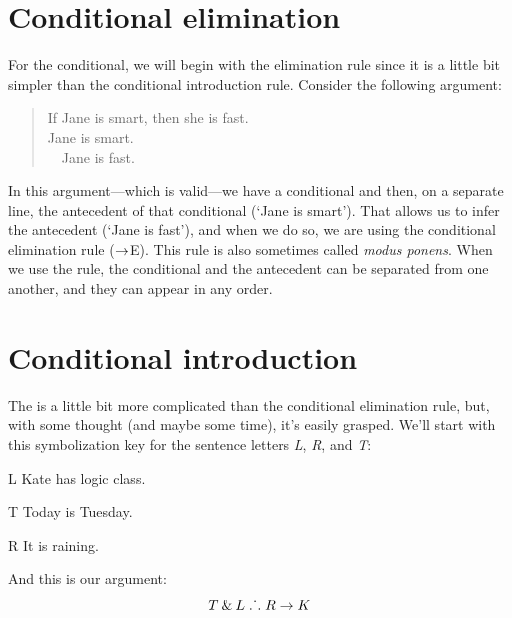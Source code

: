 \section{Conditional elimination}

For the conditional, we will begin with the elimination rule since it is a little bit simpler than the conditional introduction rule. Consider the following argument:
	\begin{quote}
		If Jane is smart, then she is fast.\\
		Jane is smart.\\ 
		\therefore~~Jane is fast.
	\end{quote}
In this argument---which is valid---we have a conditional and then, on a separate line, the antecedent of that conditional (`Jane is smart'). That allows us to infer the antecedent (`Jane is fast'), and when we do so, we are using the conditional elimination rule ($\rightarrow$E).
This rule is also sometimes called \emph{modus ponens}. When we use the rule, the conditional and the antecedent can be separated from one another, and they can appear in any order.


\section{Conditional introduction}

The  is a little bit more complicated than the conditional elimination rule, but, with some thought (and maybe some time), it's easily grasped. We'll start with this symbolization key for the sentence letters \textit{L}, \textit{R}, and \textit{T}:
	\begin{ekey}
		\item[L] Kate has logic class.
		\item[T] Today is Tuesday.
		\item[R] It is raining.
	\end{ekey}
And this is our argument: 
$$T \mathbin{\&} L \mathrel{\ldotp\dot{}\,\ldotp} R \rightarrow K$$
 
